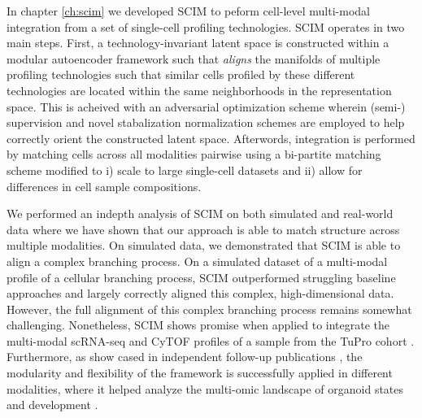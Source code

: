 In chapter \ref{ch:scim} we developed \textsc{SCIM} to peform cell-level multi-modal integration from a set of single-cell profiling technologies.
\textsc{SCIM} operates in two main steps.
First, a technology-invariant latent space is constructed within a modular autoencoder framework such that \emph{aligns} the manifolds of multiple profiling technologies such that similar cells profiled by these different technologies are located within the same neighborhoods in the representation space.
This is acheived with an adversarial optimization scheme wherein (semi-) supervision and novel stabalization normalization schemes are employed to help correctly orient the constructed latent space.
Afterwords, integration is performed by matching cells across all modalities pairwise using a bi-partite matching scheme modified to i) scale to large single-cell datasets and ii) allow for differences in cell sample compositions.

We performed an indepth analysis of \textsc{SCIM} on both simulated and real-world data where we have shown that our approach is able to match structure across multiple modalities.
On simulated data, we demonstrated that \textsc{SCIM} is able to align a complex branching process.
On a simulated dataset of a multi-modal profile of a cellular branching process, \textsc{SCIM} outperformed struggling baseline approaches and largely correctly aligned this complex, high-dimensional data.
However, the full alignment of this complex branching process remains somewhat challenging.
Nonetheless, \textsc{SCIM} shows promise when applied to integrate the multi-modal scRNA-seq and CyTOF profiles of a sample from the TuPro cohort \citep{irmisch2020}.
Furthermore, as show cased in independent follow-up publications \citep{wahle2023,fleck2023,meier2023}, the modularity and flexibility of the framework is successfully applied in different modalities, where it helped analyze the multi-omic landscape of organoid states and development .

